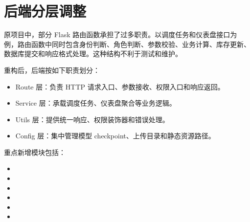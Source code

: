 
\section{后端分层调整}

原项目中，部分 Flask 路由函数承担了过多职责。以调度任务和仪表盘接口为例，路由函数中同时包含身份判断、角色判断、参数校验、业务计算、库存更新、数据库提交和响应格式处理。这种结构不利于测试和维护。

重构后，后端按如下职责划分：

\begin{itemize}
  \item Route 层：负责 HTTP 请求入口、参数接收、权限入口和响应返回。
  \item Service 层：承载调度任务、仪表盘聚合等业务逻辑。
  \item Utils 层：提供统一响应、权限装饰器和错误处理。
  \item Config 层：集中管理模型 checkpoint、上传目录和静态资源路径。
\end{itemize}

重点新增模块包括：

\begin{itemize}
  \item {}
  \item {}
  \item {}
  \item {}
  \item {}
  \item {}
\end{itemize}

